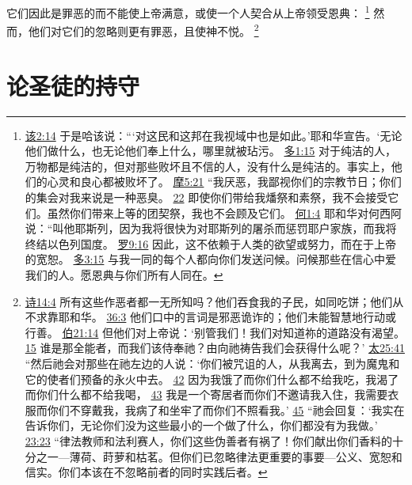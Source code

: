\documentclass[12pt, a4paper, oneside]{ctexart}
\begin{document}
	它们因此是罪恶的而不能使上帝满意，或使一个人契合从上帝领受恩典：
	\footnote {
		\href{https://biblehub.com/haggai/2-14.htm}{该2:14} 于是哈该说：“‘对这民和这邦在我视域中也是如此。’耶和华宣告。‘无论他们做什么，也无论他们奉上什么，哪里就被玷污。
		\href{https://biblehub.com/titus/1-15.htm}{多1:15} 对于纯洁的人，万物都是纯洁的，但对那些败坏且不信的人，没有什么是纯洁的。事实上，他们的心灵和良心都被败坏了。
		\href{https://biblehub.com/amos/5-21.htm}{摩5:21} “我厌恶，我鄙视你们的宗教节日；你们的集会对我来说是一种恶臭。
		\href{https://biblehub.com/amos/5-22.htm}{22} 即使你们带给我燔祭和素祭，我不会接受它们。虽然你们带来上等的团契祭，我也不会顾及它们。
		\href{https://biblehub.com/hosea/1-4.htm}{何1:4} 耶和华对何西阿说：“叫他耶斯列，因为我将很快为对耶斯列的屠杀而惩罚耶户家族，而我将终结以色列国度。
		\href{https://biblehub.com/romans/9-16.htm}{罗9:16} 因此，这不依赖于人类的欲望或努力，而在于上帝的宽恕。
		\href{https://biblehub.com/titus/3-15.htm}{多3:15} 与我一同的每个人都向你们发送问候。问候那些在信心中爱我们的人。愿恩典与你们所有人同在。
	}
	然而，他们对它们的忽略则更有罪恶，且使神不悦。
	\footnote {
		\href{https://biblehub.com/psalms/14-4.htm}{诗14:4} 所有这些作恶者都一无所知吗？他们吞食我的子民，如同吃饼；他们从不求靠耶和华。
		\href{https://biblehub.com/psalms/36-3.htm}{36:3} 他们口中的言词是邪恶诡诈的；他们未能智慧地行动或行善。
		\href{https://biblehub.com/job/21-14.htm}{伯21:14} 但他们对上帝说：‘别管我们！我们对知道祢的道路没有渴望。
		\href{https://biblehub.com/job/21-15.htm}{15} 谁是那全能者，而我们该侍奉祂？由向祂祷告我们会获得什么呢？’
		\href{https://biblehub.com/matthew/25-41.htm}{太25:41} “然后祂会对那些在祂左边的人说：‘你们被咒诅的人，从我离去，到为魔鬼和它的使者们预备的永火中去。
		\href{https://biblehub.com/matthew/25-42.htm}{42} 因为我饿了而你们什么都不给我吃，我渴了而你们什么都不给我喝，
		\href{https://biblehub.com/matthew/25-43.htm}{43} 我是一个寄居者而你们不邀请我入住，我需要衣服而你们不穿戴我，我病了和坐牢了而你们不照看我。’
		\href{https://biblehub.com/matthew/25-45.htm}{45} “祂会回复：‘我实在告诉你们，无论你们没为这些最小的一个做了什么，你们都没有为我做。’
		\href{https://biblehub.com/matthew/23-23.htm}{23:23} “律法教师和法利赛人，你们这些伪善者有祸了！你们献出你们香料的十分之一---薄荷、莳萝和枯茗。但你们已忽略律法更重要的事要---公义、宽恕和信实。你们本该在不忽略前者的同时实践后者。
	}

\section{论圣徒的持守}
\end{document}
